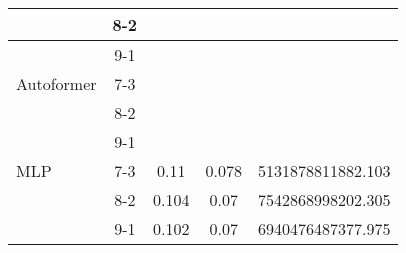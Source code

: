 \begin{table}[h!]
\begin{tabular}{|l|c|c|c|c|}
    \rowcolor{green!30}  & 8-2 &  &  &  \\ \hline
    \rowcolor{green!30}  & 9-1 &  &  &  \\ \hline
    \rowcolor{white} Autoformer & 7-3 &  &  &  \\ \hline
    \rowcolor{white}  & 8-2 &  &  &  \\ \hline
    \rowcolor{white}  & 9-1 &  &  &  \\ \hline
    \rowcolor{white} MLP & 7-3 & 0.11 & 0.078 & 5131878811882.103 \\ \hline
    \rowcolor{white}  & 8-2 & 0.104 & 0.07 & 7542868998202.305   \\ \hline
    \rowcolor{white}  & 9-1 & 0.102 & 0.07 & 6940476487377.975 \\ \hline
    \end{tabular}
    \end{table}